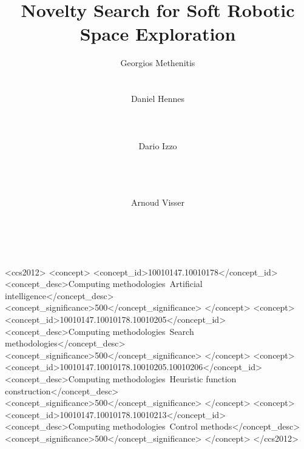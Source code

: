 \documentclass{sig-alternate}
\begin{document}
\title{Novelty Search for Soft Robotic Space Exploration}
\author{
%
\alignauthor
Georgios Methenitis\\
       \\
       \\
\alignauthor
Daniel Hennes\\
       \\
       \\
       \\
\alignauthor
Dario Izzo\\
       \\
       \\
       \\
  \and  %
\alignauthor 
Arnoud Visser\\
       \\
       \\
}

\begin{CCSXML}
<ccs2012>
<concept>
<concept_id>10010147.10010178</concept_id>
<concept_desc>Computing methodologies~Artificial intelligence</concept_desc>
<concept_significance>500</concept_significance>
</concept>
<concept>
<concept_id>10010147.10010178.10010205</concept_id>
<concept_desc>Computing methodologies~Search methodologies</concept_desc>
<concept_significance>500</concept_significance>
</concept>
<concept>
<concept_id>10010147.10010178.10010205.10010206</concept_id>
<concept_desc>Computing methodologies~Heuristic function construction</concept_desc>
<concept_significance>500</concept_significance>
</concept>
<concept>
<concept_id>10010147.10010178.10010213</concept_id>
<concept_desc>Computing methodologies~Control methods</concept_desc>
<concept_significance>500</concept_significance>
</concept>
</ccs2012>
\end{CCSXML}
\end{document}
